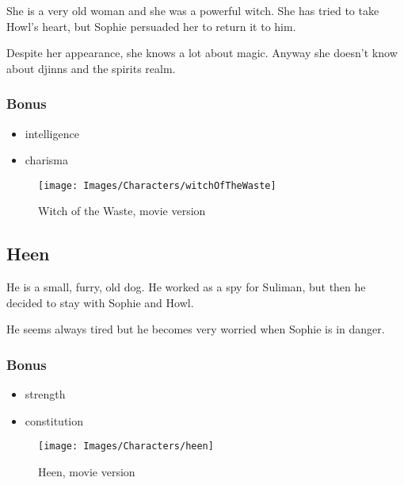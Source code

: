 \begin{minipage}{0.5\textwidth}
She is a very old woman and she was a powerful witch. She has tried to take Howl’s heart, but Sophie persuaded her to return it to him.

Despite her appearance, she knows a lot about magic. Anyway she doesn’t know about djinns and the spirits realm.

\subsubsection{Bonus}
\begin{itemize}
	\item intelligence
	\item charisma
\end{itemize}

\end{minipage}%
%
\hfill\begin{minipage}{0.4\textwidth}
  \begin{figure}[H]
    \hfill\texttt{[image: Images/Characters/witchOfTheWaste]}
    \caption{Witch of the Waste, movie version}
  \end{figure}
\end{minipage}

\subsection{Heen}

\begin{minipage}{0.5\textwidth}
He is a small, furry, old dog. He worked as a spy for Suliman, but then he decided to stay with Sophie and Howl.

He seems always tired but he becomes very worried when Sophie is in danger.

\subsubsection{Bonus}
\begin{itemize}
	\item strength
	\item constitution
\end{itemize}

\end{minipage}%
%
\hfill\begin{minipage}{0.4\textwidth}
  \begin{figure}[H]
    \hfill\texttt{[image: Images/Characters/heen]}
    \caption{Heen, movie version}
  \end{figure}
\end{minipage}%
%
